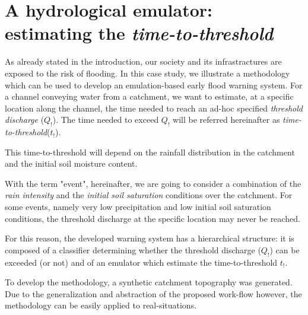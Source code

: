 \newpage

\section{A hydrological emulator: estimating the \textit{time-to-threshold}}
\label{sec:hydrological_emulator}




As already stated in the introduction, our society and its infrastractures are exposed to the risk of flooding.
In this case study, we illustrate a methodology which can be used to develop an emulation-based early flood warning system.
For a channel conveying water from a catchment, we want to estimate, at a specific location along the channel, the time needed to reach an ad-hoc specified \emph{threshold discharge} ($Q_!$). 
The time needed to exceed $Q_!$ will be referred hereinafter as \emph{time-to-threshold}($t_!$). 

This time-to-threshold will depend on the rainfall distribution in the catchment and the initial soil moisture content.

With the term "event", hereinafter, we are going to consider a combination of the \emph{rain intensity} and the \emph{initial soil saturation} conditions over the catchment. 
For some events, namely very low precipitation and low initial soil saturation conditions, the threshold discharge at the specific location may never be reached.

For this reason, the developed warning system has a hierarchical structure: it is composed of a classifier determining whether the threshold discharge ($Q_!$) can be exceeded (or not) and of an emulator which estimate the time-to-threshold $t_!$.

To develop the methodology, a synthetic catchment topography was generated. Due to the generalization and abstraction of the proposed work-flow however, the methodology can be easily applied to real-situations. 
 
